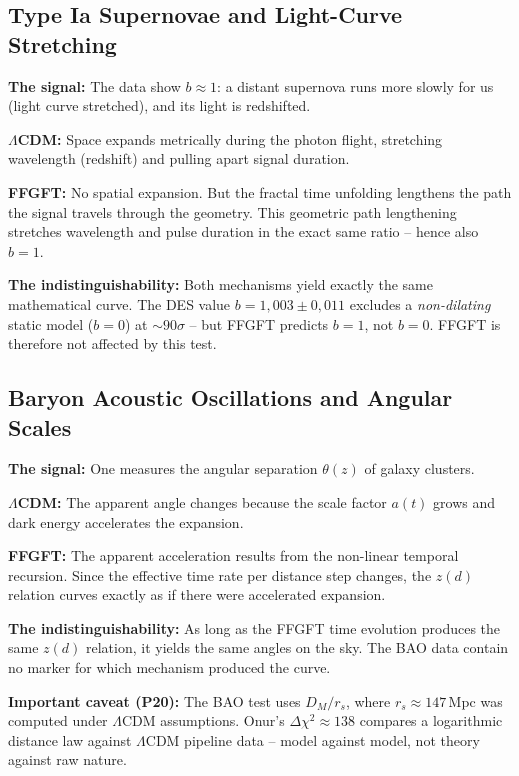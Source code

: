 \subsection{Type Ia Supernovae and Light-Curve Stretching}

\textbf{The signal:} The data show $b \approx 1$: a distant supernova runs
more slowly for us (light curve stretched), and its light is redshifted.

\textbf{$\Lambda$CDM:} Space expands metrically during the photon flight,
stretching wavelength (redshift) and pulling apart signal duration.

\textbf{FFGFT:} No spatial expansion. But the fractal time unfolding
lengthens the path the signal travels through the geometry. This geometric
path lengthening stretches wavelength and pulse duration in the exact same
ratio -- hence also $b = 1$.

\textbf{The indistinguishability:} Both mechanisms yield exactly the same
mathematical curve. The DES value $b = 1{,}003 \pm 0{,}011$ excludes a
\emph{non-dilating} static model ($b = 0$) at $\sim 90\sigma$ -- but FFGFT
predicts $b = 1$, not $b = 0$. FFGFT is therefore not affected by this test.

\subsection{Baryon Acoustic Oscillations and Angular Scales}

\textbf{The signal:} One measures the angular separation $\theta(z)$ of
galaxy clusters.

\textbf{$\Lambda$CDM:} The apparent angle changes because the scale factor
$a(t)$ grows and dark energy accelerates the expansion.

\textbf{FFGFT:} The apparent acceleration results from the non-linear
temporal recursion. Since the effective time rate per distance step changes,
the $z(d)$ relation curves exactly as if there were accelerated expansion.

\textbf{The indistinguishability:} As long as the FFGFT time evolution
produces the same $z(d)$ relation, it yields the same angles on the sky.
The BAO data contain no marker for which mechanism produced the curve.

\textbf{Important caveat (P20):} The BAO test uses $D_M/r_s$, where
$r_s \approx 147$\,Mpc was computed under $\Lambda$CDM assumptions. Onur's
$\Delta\chi^2 \approx 138$ compares a logarithmic distance law against
$\Lambda$CDM pipeline data -- model against model, not theory against raw
nature.

